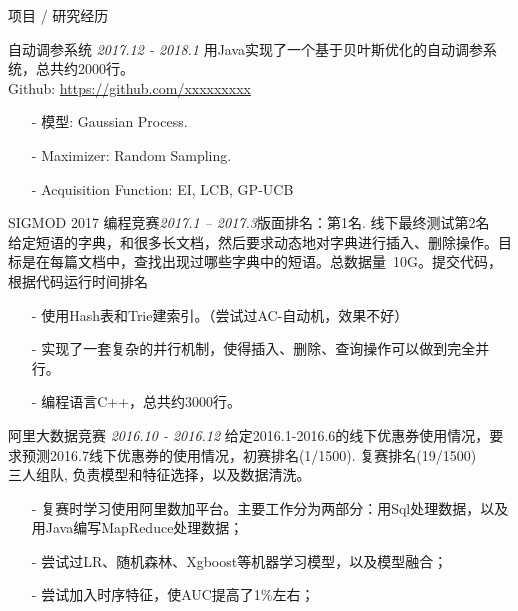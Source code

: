 \documentclass{resume} %
\begin{document}
\begin{rSection}{项目 / 研究经历}

\begin{rSubsection}{自动调参系统} {\em 2017.12 - 2018.1}
{用Java实现了一个基于贝叶斯优化的自动调参系统，总共约2000行。\\}
{Github: \rm \url{https://github.com/xxxxxxxxx}}
\item[]
\begin{itemize}
\setlength\itemsep{-0.5em}
\item[-] 模型: Gaussian Process.
\item[-] Maximizer: Random Sampling.
\item[-] Acquisition Function: EI, LCB, GP-UCB
\end{itemize}
\end{rSubsection}

\begin{rSubsection}{SIGMOD 2017 编程竞赛}{\em 2017.1 – 2017.3}{版面排名：第1名. 线下最终测试第2名 \\}
{给定短语的字典，和很多长文档，然后要求动态地对字典进行插入、删除操作。目标是在每篇文档中，查找出现过哪些字典中的短语。总数据量~10G。提交代码，根据代码运行时间排名}
\item[]
\begin{itemize}
\setlength\itemsep{-0.5em}
\item[-] 使用Hash表和Trie建索引。（尝试过AC-自动机，效果不好）
\item[-] 实现了一套复杂的并行机制，使得插入、删除、查询操作可以做到完全并行。
\item[-] 编程语言C++，总共约3000行。
\end{itemize}
\end{rSubsection}

\begin{rSubsection}{阿里大数据竞赛} {\em 2016.10 - 2016.12}
{给定2016.1-2016.6的线下优惠券使用情况，要求预测2016.7线下优惠券的使用情况，初赛排名(1/1500). 复赛排名(19/1500) \\}
{三人组队, 负责模型和特征选择，以及数据清洗。}
\item[]
\begin{itemize}
\setlength\itemsep{-0.5em}
\item[-] 复赛时学习使用阿里数加平台。主要工作分为两部分：用Sql处理数据，以及用Java编写MapReduce处理数据；
\item[-] 尝试过LR、随机森林、Xgboost等机器学习模型，以及模型融合；
\item[-] 尝试加入时序特征，使AUC提高了1\%左右；
\end{itemize}
\end{rSubsection}


\end{rSection}
\end{document}
